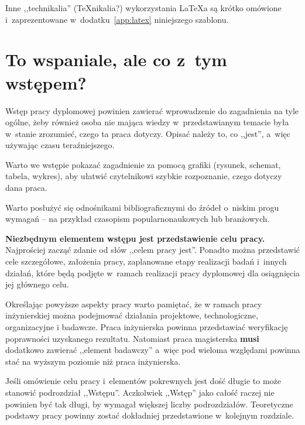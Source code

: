 Inne ,,technikalia'' (\TeX{nikalia}?) wykorzystania \LaTeX{a} są krótko omówione i~zaprezentowane w~dodatku~\ref{app:latex} niniejszego szablonu.

\section{To wspaniale, ale co z~tym wstępem?}

Wstęp pracy dyplomowej powinien zawierać wprowadzenie do zagadnienia na tyle ogólne, żeby również osoba nie mająca wiedzy w~przedstawianym temacie była w~stanie zrozumieć, czego ta praca dotyczy. Opisać należy to, co ,,jest'', a~więc używając czasu teraźniejszego.

Warto we wstępie pokazać zagadnienie za pomocą grafiki (rysunek, schemat, tabela, wykres), aby ułatwić czytelnikowi szybkie rozpoznanie, czego dotyczy dana praca.

Warto posłużyć się odnośnikami bibliograficznymi do źródeł o~niskim progu wymagań -- na przykład czasopism popularnonaukowych lub branżowych.

\textbf{Niezbędnym elementem wstępu jest przedstawienie celu pracy.} Najprościej zacząć zdanie od słów ,,celem pracy jest''. Ponadto można przedstawić cele szczegółowe, założenia pracy, zaplanowane etapy realizacji badań i~innych działań, które będą podjęte w~ramach realizacji pracy dyplomowej dla osiągnięcia jej głównego celu.

Określając powyższe aspekty pracy warto pamiętać, że w ramach pracy inżynierskiej można podejmować działania
projektowe, technologiczne, organizacyjne i badawcze. Praca inżynierska powinna przedstawiać weryfikację poprawności uzyskanego rezultatu. Natomiast praca magisterska \textbf{musi} dodatkowo zawierać ,,element badawczy'' a~więc pod wieloma względami powinna stać na wyższym poziomie niż praca inżynierska.

Jeśli omówienie celu pracy i~elementów pokrewnych jest dość długie to może stanowić podrozdział ,,Wstępu''. Aczkolwiek ,,Wstęp'' jako całość raczej nie powinien być tak długi, by wymagał większej liczby podrozdziałów. Teoretyczne podstawy pracy powinny zostać dokładniej przedstawione w~kolejnym rozdziale.